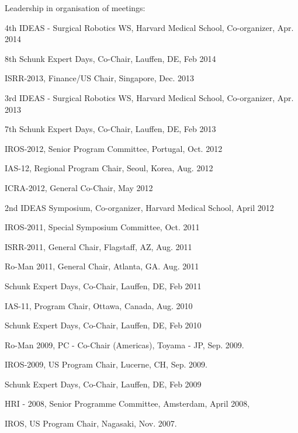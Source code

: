 \documentclass{article}
\begin{document}
\begin{cv}
\begin{cvlist}{Leadership in organisation of meetings:}
		\item 4th IDEAS - Surgical Robotics WS, Harvard Medical School, Co-organizer,
		\cftdotfill{\cftdotsep} Apr. 2014
		\item 8th Schunk Expert Days, Co-Chair, Lauffen, DE, \cftdotfill{\cftdotsep}
		Feb 2014
		\item ISRR-2013, Finance/US Chair, Singapore, \cftdotfill{\cftdotsep} Dec.
		2013
		\item 3rd IDEAS - Surgical Robotics WS, Harvard Medical School, Co-organizer,
		\cftdotfill{\cftdotsep} Apr. 2013
		\item 7th Schunk Expert Days, Co-Chair, Lauffen, DE, \cftdotfill{\cftdotsep}
		Feb 2013
		\item IROS-2012, Senior Program Committee, Portugal,\cftdotfill{\cftdotsep}
		Oct. 2012
		\item IAS-12, Regional Program Chair, Seoul, Korea, \cftdotfill{\cftdotsep}
		Aug. 2012
		\item ICRA-2012, General Co-Chair, \cftdotfill{\cftdotsep} May 2012
		\item 2nd IDEAS Symposium, Co-organizer, Harvard Medical School,
		\cftdotfill{\cftdotsep} April 2012
		\item IROS-2011, Special Symposium Committee, \cftdotfill{\cftdotsep} Oct.
		2011
		\item ISRR-2011, General Chair, Flagstaff, AZ, \cftdotfill{\cftdotsep} Aug.
		2011
		\item Ro-Man 2011, General Chair, Atlanta, GA. \cftdotfill{\cftdotsep} Aug.
		2011
		\item Schunk Expert Days, Co-Chair, Lauffen, DE, \cftdotfill{\cftdotsep} Feb
		2011
		\item IAS-11, Program Chair, Ottawa, Canada, \cftdotfill{\cftdotsep} Aug. 2010
		\item Schunk Expert Days, Co-Chair, Lauffen, DE, \cftdotfill{\cftdotsep} Feb
		2010
		\item Ro-Man 2009, PC - Co-Chair (Americas), Toyama - JP,
		\cftdotfill{\cftdotsep} Sep. 2009.
		\item IROS-2009, US Program Chair, Lucerne, CH, \cftdotfill{\cftdotsep} Sep.
		2009.
		\item Schunk Expert Days, Co-Chair, Lauffen, DE, \cftdotfill{\cftdotsep} Feb
		2009
		\item HRI - 2008, Senior Programme Committee, Amsterdam,
		\cftdotfill{\cftdotsep} April 2008,
		\item IROS, US Program Chair, Nagasaki, \cftdotfill{\cftdotsep} Nov. 2007.

\end{cvlist}
\end{cv}
\end{document}
